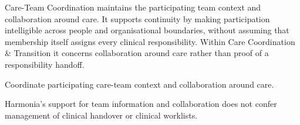 Care-Team Coordination maintains the participating team context and collaboration around care. It supports continuity by making participation intelligible across people and organisational boundaries, without assuming that membership itself assigns every clinical responsibility. Within Care Coordination \& Transition it concerns collaboration around care rather than proof of a responsibility handoff.



Coordinate participating care-team context and collaboration around care.



Harmonia's support for team information and collaboration does not confer management of clinical handover or clinical worklists.


